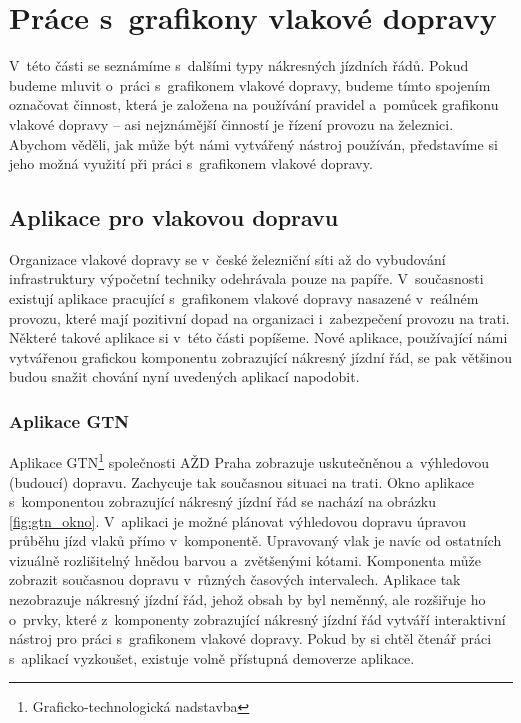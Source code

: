 \section{Práce s~grafikony vlakové dopravy}
\label{aplikace_gvd}
V~této části se seznámíme s~dalšími typy nákresných jízdních řádů. Pokud budeme mluvit o~práci s~grafikonem vlakové dopravy, budeme tímto spojením označovat činnost, která je založena na používání pravidel a~pomůcek grafikonu vlakové dopravy -- asi nejznámější činností je řízení provozu na železnici. Abychom věděli, jak může být námi vytvářený nástroj používán, představíme si jeho možná využití při práci s~grafikonem vlakové dopravy.

\subsection*{Aplikace pro vlakovou dopravu}
\label{prace_gvd}
Organizace vlakové dopravy se v~české železniční síti až do vybudování infrastruktury výpočetní techniky odehrávala pouze na papíře. V~současnosti existují aplikace pracující s~grafikonem vlakové dopravy nasazené v~reálném provozu, které mají pozitivní dopad na organizaci i~zabezpečení provozu na trati. Některé takové aplikace si v~této části popíšeme. Nové aplikace, používající námi vytvářenou grafickou komponentu zobrazující nákresný jízdní řád, se pak většinou budou snažit chování nyní uvedených aplikací napodobit.

\newpage
\subsubsection*{Aplikace GTN}
Aplikace GTN\footnote{Graficko-technologická nadstavba} společnosti AŽD Praha zobrazuje uskutečněnou a~výhledovou (budoucí) dopravu. Zachycuje tak současnou situaci na trati. Okno aplikace s~komponentou zobrazující nákresný jízdní řád se nachází na obrázku \ref{fig:gtn_okno}. V~aplikaci je možné plánovat výhledovou dopravu úpravou průběhu jízd vlaků přímo v~komponentě. Upravovaný vlak je navíc od ostatních vizuálně rozlišitelný hnědou barvou a~zvětšenými kótami. Komponenta může zobrazit současnou dopravu v~různých časových intervalech. Aplikace tak nezobrazuje nákresný jízdní řád, jehož obsah by byl neměnný, ale rozšiřuje ho o~prvky, které z~komponenty zobrazující nákresný jízdní řád vytváří interaktivní nástroj pro práci s~grafikonem vlakové dopravy. Pokud by si chtěl čtenář práci s~aplikací vyzkoušet, existuje volně přístupná demoverze \cite{GTN_demoverze} aplikace.

